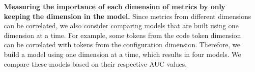 
\noindent\textbf{Measuring the importance of each dimension of metrics by only keeping the dimension in the model.} 
Since metrics from different dimensions can be correlated, we also consider comparing models that are built using one dimension at a time. %
For example, some tokens from the code token dimension can be correlated with tokens from the configuration dimension. Therefore, we build a model using one dimension at a time, which results in four models. We compare these models based on their respective AUC values. 

